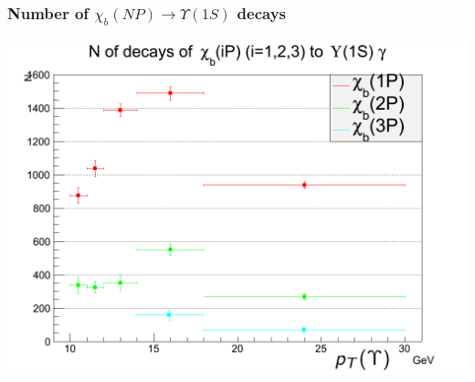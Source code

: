 \documentclass{beamer}
\begin{document}
\begin{frame}
\frametitle{Number of $\chi_b(NP) \rightarrow \Upsilon(1S)$ decays}
\includegraphics[width=.9\textwidth]{images/spectr.png}
\end{frame}
\end{document}
